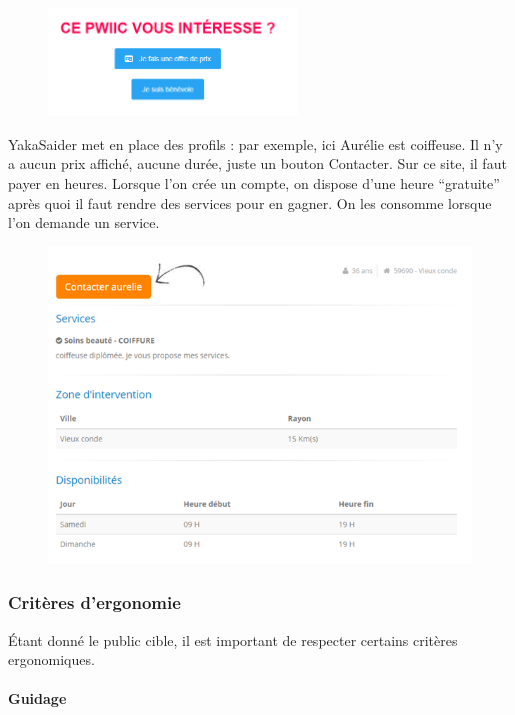 \documentclass[a4paper,11pt]{article}
\begin{document}
\begin{figure}[H]
  \includegraphics[width=250px]{images/pieces-pwiic.png}
  \label{fig:pieces-pwiic}
\end{figure}

YakaSaider met en place des profils : par exemple, ici Aurélie est coiffeuse. Il n’y a aucun prix affiché,
aucune durée, juste un bouton Contacter. Sur ce site, il faut payer en heures. Lorsque l’on crée un compte,
on dispose d’une heure “gratuite” après quoi il faut rendre des services pour en gagner.
On les consomme lorsque l’on demande un service.\\

\begin{figure}[H]
  \includegraphics[width=500px]{images/aurelie-yakasaider.png}
  \label{fig:aurelie-yakasaider}
\end{figure}

\subsubsection{Critères d'ergonomie}

Étant donné le public cible, il est important de respecter certains critères ergonomiques.\\

\paragraph{Guidage}
\end{document}

